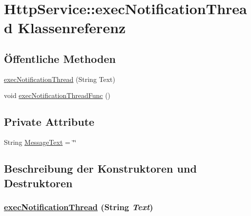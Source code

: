 \hypertarget{classQbeSAS_1_1HttpService_1_1execNotificationThread}{
\section{Http\-Service::exec\-Notification\-Thread Klassenreferenz}
\label{classQbeSAS_1_1HttpService_1_1execNotificationThread}
}
\subsection*{\"{O}ffentliche Methoden}
\begin{CompactItemize}
\item 
\hyperlink{classQbeSAS_1_1HttpService_1_1execNotificationThread_QbeSAS_1_1HttpService_1_1execNotificationThreada0}{exec\-Notification\-Thread} (String Text)
\item 
void \hyperlink{classQbeSAS_1_1HttpService_1_1execNotificationThread_QbeSAS_1_1HttpService_1_1execNotificationThreada1}{exec\-Notification\-Thread\-Func} ()
\end{CompactItemize}
\subsection*{Private Attribute}
\begin{CompactItemize}
\item 
String \hyperlink{classQbeSAS_1_1HttpService_1_1execNotificationThread_QbeSAS_1_1HttpService_1_1execNotificationThreadr0}{Message\-Text} = \char`\"{}\char`\"{}
\end{CompactItemize}


\subsection{Beschreibung der Konstruktoren und Destruktoren}
\hypertarget{classQbeSAS_1_1HttpService_1_1execNotificationThread_QbeSAS_1_1HttpService_1_1execNotificationThreada0}{
\subsubsection[execNotificationThread]{\setlength{\rightskip}{0pt plus 5cm}\hyperlink{classQbeSAS_1_1HttpService_1_1execNotificationThread}{exec\-Notification\-Thread} (String {\em Text})}}
\label{classQbeSAS_1_1HttpService_1_1execNotificationThread_QbeSAS_1_1HttpService_1_1execNotificationThreada0}




